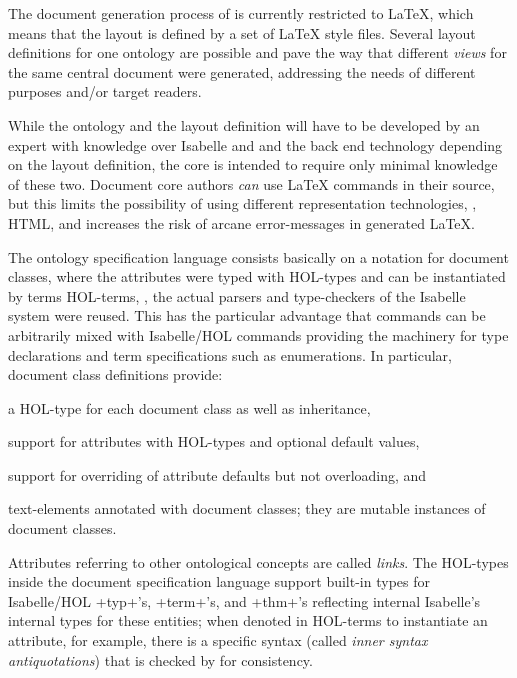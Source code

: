 \begin{isabellebody}
\begin{isamarkuptext}
 The document generation process of \isadof is currently restricted to \LaTeX, which means
that the layout is defined by a set of \LaTeX{} style files. Several layout 
definitions for one ontology are possible and pave the way that different \emph{views} for
the same central document were generated, addressing the needs of different purposes and/or target 
readers. 

 While the ontology and the layout definition will have to be developed by an expert
with knowledge over Isabelle and \isadof and the back end technology depending on the layout 
definition, the core is intended to require only minimal knowledge of these two. Document core
authors \emph{can}  use \LaTeX{}  commands in their source, but this limits the possibility 
of using different representation technologies, \eg, HTML, and increases the risk of arcane
error-messages in generated \LaTeX{}. 

 The \isadof ontology specification language consists basically on a notation for
document classes, where the attributes were typed with HOL-types and can be instantiated 
by terms HOL-terms, \ie, the actual parsers and type-checkers of the Isabelle system were reused.
This has the particular advantage that \isadof commands can be arbitrarily mixed with 
Isabelle/HOL commands providing the machinery for type declarations and term specifications such
as enumerations. In particular, document class definitions provide:
\begin{compactitem}
\item  a HOL-type for each document class as well as inheritance, 
\item  support for attributes with HOL-types and optional default values,
\item  support for overriding of attribute defaults but not overloading, and
\item  text-elements annotated with document classes; they are mutable 
   instances of document classes.
\end{compactitem}
Attributes referring to other ontological concepts are called \emph{links}. 
The HOL-types inside the document specification language support built-in types for Isabelle/HOL \inlineisar+typ+'s, 
\inlineisar+term+'s, and \inlineisar+thm+'s reflecting internal Isabelle's internal types 
for these entities; when denoted in HOL-terms to instantiate an attribute, for example, there is a 
specific syntax (called \emph{inner syntax antiquotations}) that is checked by \isadof 
for consistency.


\end{isamarkuptext}
\end{isabellebody}
